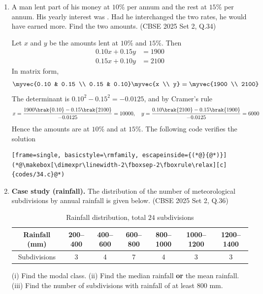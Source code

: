 \begin{enumerate}[label=\thesubsection.\arabic*, ref=\thesubsection.\theenumi]
\item
A man lent part of his money at $10\%$ per annum and the rest at $15\%$ per annum. His yearly interest was . Had he interchanged the two rates, he would have earned  more. Find the two amounts.
\hfill (CBSE 2025 Set 2, Q.34)

\solution
Let $x$ and $y$ be the amounts lent at $10\%$ and $15\%$. Then
\begin{align}
	0.10x + 0.15y &= 1900 \\
	0.15x + 0.10y &= 2100
\end{align}
In matrix form,
\begin{align}
	\myvec{0.10 & 0.15 \\ 0.15 & 0.10}\myvec{x \\ y} = \myvec{1900 \\ 2100}
\end{align}
The determinant is $0.10^2 - 0.15^2 = -0.0125$, and by Cramer's rule
\begin{align}
	x = \frac{1900\brak{0.10} - 0.15\brak{2100}}{-0.0125} = 10000, \quad
	y = \frac{0.10\brak{2100} - 0.15\brak{1900}}{-0.0125} = 6000
\end{align}
Hence the amounts are  at $10\%$ and  at $15\%$. The following code verifies the solution
\begin{lstlisting}[frame=single, basicstyle=\rmfamily, escapeinside={(*@}{@*)}]
(*@\makebox[\dimexpr\linewidth-2\fboxsep-2\fboxrule\relax][c]{codes/34.c}@*)
\end{lstlisting}

\item
\textbf{Case study (rainfall).} The distribution of the number of meteorological subdivisions by annual rainfall is given below.
\hfill (CBSE 2025 Set 2, Q.36)
\begin{table}[H]
	\centering
	\begin{tabular}{|c|c|c|c|c|c|c|}
		\hline
		Rainfall (mm) & 200--400 & 400--600 & 600--800 & 800--1000 & 1000--1200 & 1200--1400 \\ \hline
		Subdivisions & 3 & 4 & 7 & 4 & 3 & 3 \\ \hline
	\end{tabular}
	\caption{Rainfall distribution, total $24$ subdivisions}
	\label{tab:CBSE25S2-q36}
\end{table}
(i) Find the modal class. (ii) Find the median rainfall \textbf{or} the mean rainfall. (iii) Find the number of subdivisions with rainfall of at least $800$ mm.


\end{enumerate}
